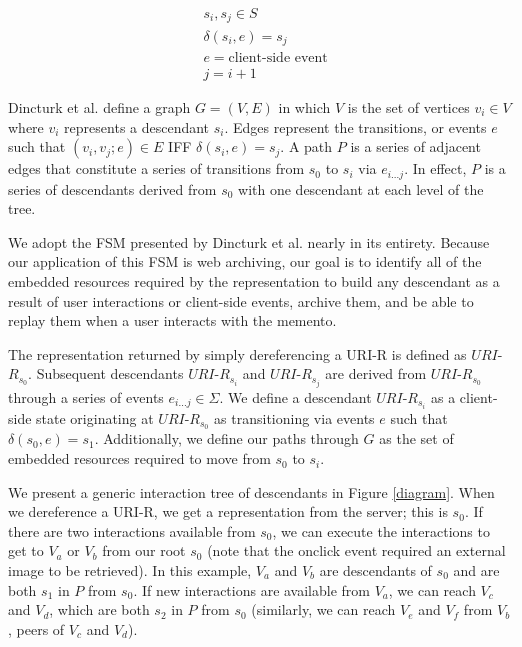 \documentclass{sig-alternate}
\begin{document}
\begin{equation}
\begin{split} 
&s_i, s_j \in S\\
&\delta(s_i, e) = s_j\\
&e = \text{client-side event}\\
&j = i+1
\end{split}
\label{statedef}
\end{equation}


Dincturk et al. define a graph $G=(V, E)$ in which $V$ is the set of vertices $v_i \in V$ where $v_i$ represents a descendant $s_i$. Edges represent the transitions, or events $e$ such that $(v_i, v_j;e) \in E$ IFF $\delta(s_i, e)=s_j$. A path $P$ is a series of adjacent edges that constitute a series of transitions from $s_0$ to $s_i$ via $e_{i...j}$. In effect, $P$ is a series of descendants derived from $s_0$ with one descendant at each level of the tree.

We adopt the FSM presented by Dincturk et al. nearly in its entirety. Because our application of this FSM is web archiving, our goal is to identify all of the embedded resources required by the representation to build any descendant as a result of user interactions or client-side events, archive them, and be able to replay them when a user interacts with the memento. 

The representation returned by simply dereferencing a URI-R is defined as $URI$-$R_{s_0}$. Subsequent descendants $URI$-$R_{s_i}$ and $URI$-$R_{s_j}$ are derived from $URI$-$R_{s_0}$ through a series of events $e_{i...j} \in \Sigma$. We define a descendant $URI$-$R_{s_i}$ as a client-side state originating at $URI$-$R_{s_0}$ as transitioning via events $e$ such that $\delta(s_0, e) = s_1$. Additionally, we define our paths through $G$ as the set of embedded resources required to move from $s_0$ to $s_i$.

We present a generic interaction tree of descendants in Figure \ref{diagram}. When we dereference a URI-R, we get a representation from the server; this is $s_0$. If there are two interactions available from $s_0$, we can execute the interactions to get to $V_a$ or $V_b$ from our root $s_0$ (note that the onclick event required an external image to be retrieved). In this example, $V_a$ and $V_b$ are descendants of $s_0$ and are both $s_1$ in $P$ from $s_0$. If new interactions are available from $V_a$, we can reach $V_c$ and $V_d$, which are both $s_2$ in $P$ from $s_0$ (similarly, we can reach $V_e$ and $V_f$ from $V_b$, peers of $V_c$ and $V_d$). 
\end{document}
